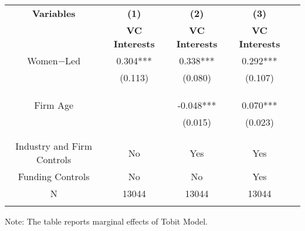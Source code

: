  \begin{table}[htbp]
    \begin{tabular}{c c c c c}
    \toprule
    \textbf{Variables} & \textbf{(1)} & \textbf{(2)} & \textbf{(3)}         \\ 
    \textbf & \textbf{VC Interests} & \textbf{VC Interests} & \textbf{VC Interests}   \\ 

    \midrule
    Women$-$Led         &    0.304*** &      0.338***  &        0.292***   \\
                        &    (0.113)  &      (0.080)   &         (0.107)  \\
                        &             &                &                  \\

                        &             &                &             \\
                        &             &                &                    \\
    Firm Age            &             &      -0.048*** &    0.070***        \\
                        &             &      (0.015)   &    (0.023)       \\
                        &             &                &                 \\
                        &             &                &                \\

Industry and Firm Controls   &   No        &   Yes       &          Yes    \\
    Funding Controls    &   No             &   No        &        Yes        \\

    \midrule
     N                  &   13044          &      13044  &     13044      \\          
    \bottomrule
  
    \addlinespace[1ex]
    \multicolumn{3}{l}{\textsuperscript{***}$p<0.01$, 
      \textsuperscript{**}$p<0.05$, 
      \textsuperscript{*}$p<0.1$}

\end{tabular}
Note: The table reports marginal effects of Tobit Model.

\end{table}

